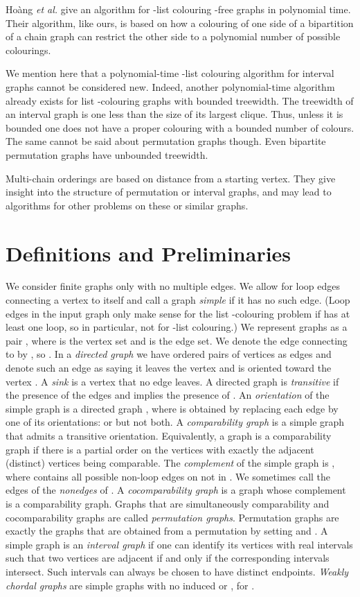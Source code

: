 \documentclass[12pt]{llncs}
\begin{document}
 Ho{\`{a}}ng \textit{et al.} \cite{hoangP5} give an algorithm for -list colouring 
 -free graphs in polynomial time. 
 Their algorithm, like ours, is based on how a colouring of one side of a bipartition of a chain graph
 can restrict the other side to a polynomial number of possible colourings.  
 




We mention here that a polynomial-time -list colouring algorithm for
interval graphs cannot be considered
new. Indeed, another polynomial-time algorithm already exists for list
-colouring graphs
with bounded treewidth. The treewidth of an interval graph is
one less than the size of its largest clique. Thus, unless it is
bounded one does not have a proper colouring with a bounded number of
colours. The same cannot be said about permutation graphs though. Even
bipartite permutation graphs have unbounded treewidth.


Multi-chain orderings are based on distance from a
starting vertex. They give insight into the structure of permutation
or interval graphs, and may lead to algorithms for other problems on
these or similar graphs.

\section{Definitions and Preliminaries}
We consider finite graphs only with no multiple edges. We allow for loop
edges connecting a vertex to itself and call a graph {\em simple} if it has
no such edge. (Loop edges in the input graph only make
sense for the list
-colouring problem if  has at least one loop, so in particular, not for
-list colouring.) We represent graphs as a pair , where
 is the vertex set and  is the edge set. We denote the edge
connecting  to  by , so . In a {\em
directed graph} we have ordered pairs of vertices as edges and
denote such an edge as  saying it leaves the
vertex  and is oriented toward the vertex . A {\em sink} is a
vertex that no edge leaves. A directed graph is {\em transitive} if
the presence of the edges  and 
implies the presence of . An {\em orientation} of
the simple graph  is a directed graph ,
where  is obtained by replacing each edge
 by one of its orientations:  or
 but not both. A {\em comparability graph} is a
simple graph that admits a transitive orientation. Equivalently, a graph is a
comparability graph if there is a partial order on the vertices with
exactly the adjacent (distinct) vertices being comparable. The {\em
complement} of the simple graph  is ,
where  contains all possible non-loop edges on  not in . We
sometimes call the edges of  the {\em nonedges} of . A {\em
cocomparability graph} is a graph whose complement is a
comparability graph.
Graphs that are simultaneously comparability and cocomparability graphs are called {\em permutation graphs}. Permutation graphs are exactly the graphs  that are obtained from a permutation  by setting  and . A
simple graph is an {\em interval
graph} if one can identify its vertices with real intervals
such that two vertices are adjacent if and only if the corresponding
intervals intersect.
Such intervals can always be chosen to have distinct endpoints.
{\em Weakly chordal graphs} are simple graphs with no induced  or , for .
\end{document}
